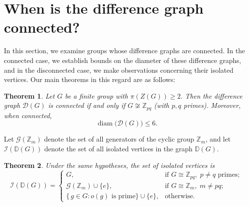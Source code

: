 \documentclass[12pt]{amsart}
\theoremstyle{plain}
\newtheorem{theorem}{Theorem}[section]
\theoremstyle{remark}
\theoremstyle{definition}
\begin{document}

\section{When is the difference graph connected?}
\label{sec:connected}

In this section, we examine groups whose difference graphs are connected. In the connected case, we establish bounds on the diameter of these difference graphs, and in the disconnected case, we make observations concerning their isolated vertices. Our main theorems in this regard are as follows:

\begin{theorem}\label{t:conn}
Let $G$ be a finite group with $\pi(Z(G))\ge2.$ Then the difference graph $\mathcal D(G)$ is connected if and only if $G\not\cong\mathbb Z_{pq}$ (with $p,q$ primes). Moreover, when connected,
\[
\operatorname{diam}\bigl(\mathcal D(G)\bigr)\leq 6.
\]
\end{theorem}

Let $\mathcal G(\mathbb Z_m)$ denote the set of all generators of the cyclic group $\mathbb Z_m$, and let $\mathcal I(\mathbb{D}(G))$ denote the set of all isolated vertices in the graph $\mathbb{D}(G)$.

\begin{theorem}\label{t:isol}
Under the same hypotheses, the set of isolated vertices is
\[
\mathcal I(\mathbb{D}(G)) =
\begin{cases}
G, & \text{if } G \cong \mathbb Z_{pq},\; p\ne q\text{ primes};\\
\mathcal G(\mathbb Z_m)\cup\{e\}, & \text{if } G \cong \mathbb Z_m,\; m\ne pq;\\
\{\,g\in G : o(g)\text{ is prime}\}\cup\{e\}, & \text{otherwise}.
\end{cases}
\]
\end{theorem}

\end{document}
